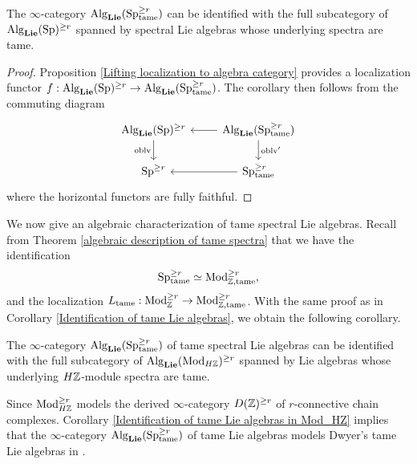 \begin{corollary}
\label{Identification of tame Lie algebras}
	The $\infty$-category $\operatorname{Alg}_{\mathbf{Lie}}(\operatorname{Sp}^{\geq r}_{\operatorname{\operatorname{tame}}})$ can be identified with the full subcategory of $\operatorname{Alg}_{\mathbf{Lie}}(\operatorname{Sp})^{\geq r}$ spanned by spectral Lie algebras whose underlying spectra are tame.
\end{corollary}
\begin{proof}
    Proposition \ref{Lifting localization to algebra category} provides a localization functor
	$f: \operatorname{Alg}_{\mathbf{Lie}}(\operatorname{Sp})^{\geq r} \to \operatorname{Alg}_{\mathbf{Lie}}(\operatorname{Sp}^{\geq r}_{\operatorname{\operatorname{tame}}})$. The corollary then follows from the commuting diagram
\[
\begin{tikzcd}
	\Alg_{\spLie}(\Sp)^{\geq r} & \Alg_{\spLie}(\Sp^{\geq r}_{\tame})\\
	\Sp^{\geq r}  & 
	\Sp^{\geq r}_{\tame}
	\arrow[from=1-2, to= 1-1]
	\arrow[from=1-1, to=2-1, "\oblv" left]
	\arrow[from=1-2, to=2-2, "\oblv'" ]
	\arrow[from=2-2, to= 2-1]
\end{tikzcd}
\]
where the horizontal functors are fully faithful. 

\end{proof}

We now give an algebraic characterization of tame spectral Lie algebras.
Recall from Theorem \ref{algebraic description of tame spectra} that we have the identification
$$
\operatorname{Sp}^{\geq r}_{\operatorname{\operatorname{tame}}} \simeq
\operatorname{Mod}_{{\mathbb{Z}},\operatorname{\operatorname{tame}}}^{\geq r},
$$
and the localization $L_{\operatorname{\operatorname{tame}}}:\operatorname{Mod}_{{\mathbb{Z}}}^{\geq r} \to \operatorname{Mod}_{{\mathbb{Z}},\operatorname{\operatorname{tame}}}^{\geq r}$. With the same proof as in Corollary \ref{Identification of tame Lie algebras}, we obtain the following corollary.
\begin{corollary}
\label{Identification of tame Lie algebras in Mod_HZ}
    The $\infty$-category $\operatorname{Alg}_{\mathbf{Lie}}(\operatorname{Sp}^{\geq r}_{\operatorname{\operatorname{tame}}})$ of tame spectral Lie algebras can be identified with the full subcategory of $\operatorname{Alg}_{\mathbf{Lie}}(\operatorname{Mod}_{H{\mathbb{Z}}})^{\geq r}$ spanned by Lie algebras whose underlying $H{\mathbb{Z}}$-module spectra are tame.
\end{corollary}

\begin{remark}
\label{Identify tame Lie algebra with Dwyer's Lie algebra}
Since $\operatorname{Mod}_{H{\mathbb{Z}}}^{\geq r}$ models the derived $\infty$-category $D({\mathbb{Z}})^{\geq r}$ of $r$-connective chain complexes. Corollary \ref{Identification of tame Lie algebras in Mod_HZ} implies that the $\infty$-category $\operatorname{Alg}_{\mathbf{Lie}}(\operatorname{Sp}^{\geq r}_{\operatorname{\operatorname{tame}}})$ of tame Lie algebras models Dwyer's tame Lie algebras in \cite{Dwyer}.
\end{remark}

